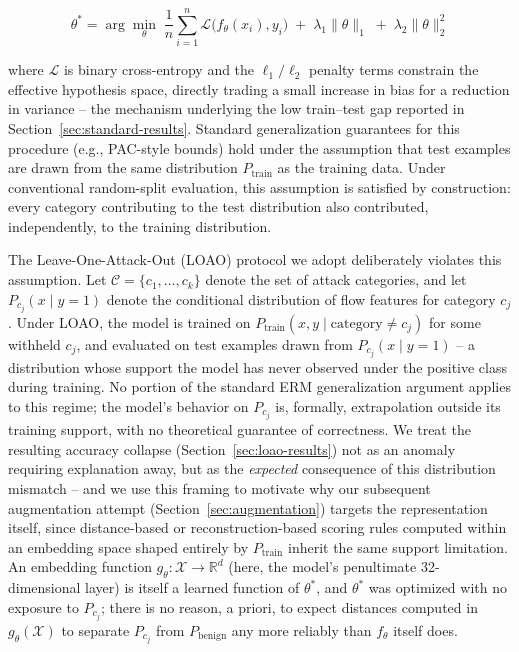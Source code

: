 \documentclass[11pt]{article}
\begin{document}
\begin{equation}
\theta^{*} = \arg\min_{\theta} \; \frac{1}{n} \sum_{i=1}^{n} \mathcal{L}\big(f_\theta(x_i), y_i\big)
\;+\; \lambda_1 \lVert \theta \rVert_1 \;+\; \lambda_2 \lVert \theta \rVert_2^2
\label{eq:erm}
\end{equation}

where $\mathcal{L}$ is binary cross-entropy and the $\ell_1/\ell_2$ penalty terms constrain the
effective hypothesis space, directly trading a small increase in bias for a reduction in variance
-- the mechanism underlying the low train--test gap reported in Section~\ref{sec:standard-results}.
Standard generalization guarantees for this procedure (e.g., PAC-style bounds) hold under the
assumption that test examples are drawn from the same distribution $P_{\text{train}}$ as the
training data. Under conventional random-split evaluation, this assumption is satisfied by
construction: every category contributing to the test distribution also contributed, independently,
to the training distribution.

The Leave-One-Attack-Out (LOAO) protocol we adopt deliberately violates this assumption. Let
$\mathcal{C} = \{c_1, \ldots, c_k\}$ denote the set of attack categories, and let
$P_{c_j}(x \mid y=1)$ denote the conditional distribution of flow features for category $c_j$.
Under LOAO, the model is trained on $P_{\text{train}}(x, y \mid \text{category} \neq c_j)$ for some
withheld $c_j$, and evaluated on test examples drawn from $P_{c_j}(x \mid y=1)$ -- a distribution
whose support the model has never observed under the positive class during training. No portion of
the standard ERM generalization argument applies to this regime; the model's behavior on
$P_{c_j}$ is, formally, extrapolation outside its training support, with no theoretical guarantee
of correctness. We treat the resulting accuracy collapse (Section~\ref{sec:loao-results}) not as an
anomaly requiring explanation away, but as the \emph{expected} consequence of this distribution
mismatch -- and we use this framing to motivate why our subsequent augmentation attempt
(Section~\ref{sec:augmentation}) targets the representation itself, since distance-based or
reconstruction-based scoring rules computed within an embedding space shaped entirely by
$P_{\text{train}}$ inherit the same support limitation. An embedding function
$g_\theta : \mathcal{X} \to \mathbb{R}^{d}$ (here, the model's penultimate 32-dimensional layer) is
itself a learned function of $\theta^{*}$, and $\theta^{*}$ was optimized with no exposure to
$P_{c_j}$; there is no reason, a priori, to expect distances computed in $g_\theta(\mathcal{X})$ to
separate $P_{c_j}$ from $P_{\text{benign}}$ any more reliably than $f_\theta$ itself does.
\end{document}

